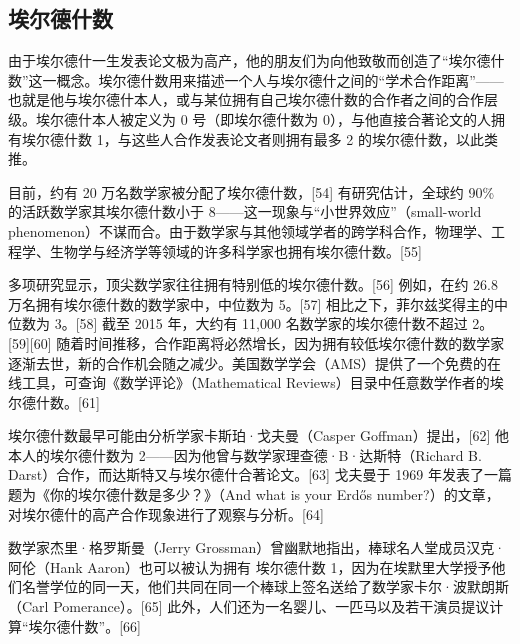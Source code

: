 \subsection{埃尔德什数}
由于埃尔德什一生发表论文极为高产，他的朋友们为向他致敬而创造了“埃尔德什数”这一概念。埃尔德什数用来描述一个人与埃尔德什之间的“学术合作距离”——也就是他与埃尔德什本人，或与某位拥有自己埃尔德什数的合作者之间的合作层级。埃尔德什本人被定义为 0 号（即埃尔德什数为 0），与他直接合著论文的人拥有埃尔德什数 1，与这些人合作发表论文者则拥有最多 2 的埃尔德什数，以此类推。

目前，约有 20 万名数学家被分配了埃尔德什数，[54] 有研究估计，全球约 90\% 的活跃数学家其埃尔德什数小于 8——这一现象与“小世界效应”（small-world phenomenon）不谋而合。由于数学家与其他领域学者的跨学科合作，物理学、工程学、生物学与经济学等领域的许多科学家也拥有埃尔德什数。[55]

多项研究显示，顶尖数学家往往拥有特别低的埃尔德什数。[56] 例如，在约 26.8 万名拥有埃尔德什数的数学家中，中位数为 5。[57] 相比之下，菲尔兹奖得主的中位数为 3。[58] 截至 2015 年，大约有 11,000 名数学家的埃尔德什数不超过 2。[59][60] 随着时间推移，合作距离将必然增长，因为拥有较低埃尔德什数的数学家逐渐去世，新的合作机会随之减少。美国数学学会（AMS）提供了一个免费的在线工具，可查询《数学评论》（Mathematical Reviews）目录中任意数学作者的埃尔德什数。[61]

埃尔德什数最早可能由分析学家卡斯珀·戈夫曼（Casper Goffman）提出，[62] 他本人的埃尔德什数为 2——因为他曾与数学家理查德·B·达斯特（Richard B. Darst）合作，而达斯特又与埃尔德什合著论文。[63] 戈夫曼于 1969 年发表了一篇题为《你的埃尔德什数是多少？》（And what is your Erdős number?）的文章，对埃尔德什的高产合作现象进行了观察与分析。[64]

数学家杰里·格罗斯曼（Jerry Grossman）曾幽默地指出，棒球名人堂成员汉克·阿伦（Hank Aaron）也可以被认为拥有 埃尔德什数 1，因为在埃默里大学授予他们名誉学位的同一天，他们共同在同一个棒球上签名送给了数学家卡尔·波默朗斯（Carl Pomerance）。[65] 此外，人们还为一名婴儿、一匹马以及若干演员提议计算“埃尔德什数”。[66]
